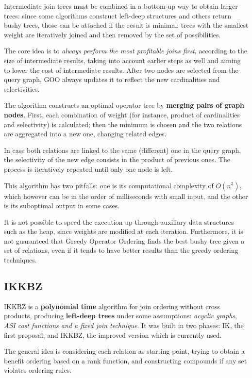 Intermediate join trees must be combined in a bottom-up way to obtain larger trees: since some algorithms construct left-deep structures and others return bushy trees, those can be attached if the result is minimal: trees with the smallest weight are iteratively joined and then removed by the set of possibilities. 

The core idea is to \textit{always perform the most profitable joins first}, according to the size of intermediate results, taking into account earlier steps as well and aiming to lower the cost of intermediate results. After two nodes are selected from the query graph, GOO always updates it to reflect the new cardinalities and selectivities.

The algorithm constructs an optimal operator tree by \textbf{merging pairs of graph nodes}. First, each combination of weight (for instance, product of cardinalities and selectivity) is calculated; then the minimum is chosen and the two relations are aggregated into a new one, changing related edges. 

In case both relations are linked to the same (different) one in the query graph, the selectivity of the new edge consists in the product of previous ones. The process is iteratively repeated until only one node is left. 

This algorithm has two pitfalls: one is its computational complexity of $O(n^3)$, which however can be in the order of milliseconds with small input, and the other is its suboptimal output in some cases.

It is not possible to speed the execution up through auxiliary data structures such as the heap, since weights are modified at each iteration. Furthermore, it is not guaranteed that Greedy Operator Ordering finds the best bushy tree given a set of relations, even if it tends to have better results than the greedy ordering techniques.

\subsection{IKKBZ}
IKKBZ is a \textbf{polynomial time} algorithm for join ordering without cross products, producing \textbf{left-deep trees} under some assumptions: \textit{acyclic graphs, ASI cost functions and a fixed join technique}. It was built in two phases: IK, the first proposal, and IKKBZ, the improved version which is currently used.

The general idea is considering each relation as starting point, trying to obtain a benefit ordering based on a rank function, and constructing compounds if any set violates ordering rules.

